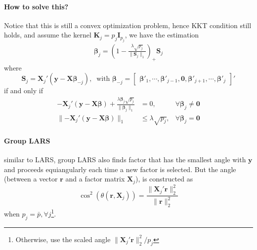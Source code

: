 \documentclass[twoside]{article}
\begin{document}
\paragraph*{How to solve this?} Notice that this is still a convex optimization problem, hence KKT condition still holds, and assume the kernel $\mathbf{K}_j = p_j \mathbf{I}_{p_j}$, we have the estimation
\begin{align*}
    \boldsymbol{\beta}_j = \left( 1- \frac{\lambda \sqrt{p_j}}{\lVert \mathbf{S}_j \rVert _1} \right)_+ \mathbf{S}_j
\end{align*}
where 
$$
\mathbf{S}_j = \mathbf{X}_j'\left(\mathbf{y}-\mathbf{X}\boldsymbol{\beta}_{-j} \right), \ \text{ with }\boldsymbol{\beta}_{-j}=\begin{bmatrix}
    \boldsymbol{\beta}'_1, \cdots, \boldsymbol{\beta}'_{j-1}, \mathbf{0}, \boldsymbol{\beta}'_{j+1}, \cdots, \boldsymbol{\beta}'_j
\end{bmatrix}'
$$
if and only if
\begin{align*}
    -\mathbf{X}_j'\left(\mathbf{y}-\mathbf{X}\boldsymbol{\beta} \right) + \frac{\lambda \boldsymbol{\beta}_j\sqrt{p_j}}{\lVert \boldsymbol{\beta}_j \rVert _1} &=0, &\forall \boldsymbol{\beta}_j\neq \mathbf{0} \\
    \lVert -\mathbf{X}_j'\left(\mathbf{y}-\mathbf{X}\boldsymbol{\beta} \right)\rVert _1 & \leq \lambda \sqrt{p_j}, & \forall \boldsymbol{\beta}_j = \mathbf{0}
\end{align*}

\paragraph*{Group LARS} similar to LARS, group LARS also finds factor that has the smallest angle with $\mathbf{y}$ and proceeds equiangularly each time a new factor is selected. But the angle (between a vector $\mathbf{r}$ and a factor matrix $\mathbf{X}_j$), is constructed as 
$$
\cos^2\left( \theta(\mathbf{r},\mathbf{X}_j) \right) = \frac{\lVert \mathbf{X}_j'\mathbf{r} \rVert _2^2}{\lVert \mathbf{r} \rVert _2^2}
$$
when $p_j=\bar{p},\forall j$\footnote{Otherwise, use the scaled angle $\lVert \mathbf{X}_j'\mathbf{r} \rVert _2^2/p_j$}.
\end{document}
